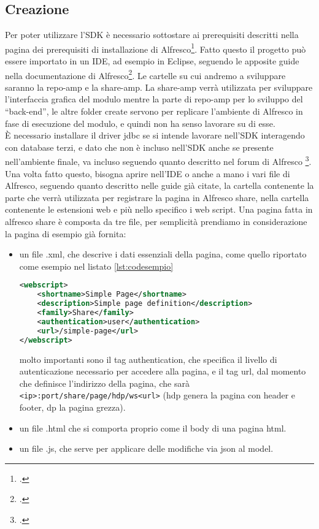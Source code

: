 \subsection{Creazione}
Per poter utilizzare l'SDK è necessario sottostare ai prerequisiti descritti nella pagina dei prerequisiti di installazione di Alfresco\footcite{site:alfresco-prerequisites}.
Fatto questo il progetto può essere importato in un IDE, ad esempio in Eclipse, seguendo le apposite guide nella documentazione di Alfresco\footcite{site:alfresco-rad}. 
Le cartelle su cui andremo a sviluppare saranno la repo-amp e la share-amp. La share-amp verrà utilizzata per sviluppare l’interfaccia grafica del modulo mentre la parte di repo-amp  per lo sviluppo del “back-end”, le altre folder create servono per replicare l’ambiente di Alfresco in fase di esecuzione del modulo, e quindi non ha senso lavorare su di esse.\\
È necessario installare il driver jdbc se si intende  lavorare nell’SDK interagendo con database terzi, e dato che non è incluso nell'SDK anche se presente nell'ambiente finale, va incluso seguendo quanto descritto nel forum di Alfresco \footcite{site:alfresco-jdbc}. 
Una volta fatto questo, bisogna aprire nell’IDE o anche a mano i vari file di Alfresco, seguendo quanto descritto nelle guide già citate, la cartella contenente la parte che verrà utilizzata per registrare la pagina in Alfresco share, nella cartella contenente le estensioni web e più nello specifico i web script. %
Una pagina fatta in alfresco share è composta da tre file, per semplicità prendiamo in considerazione la pagina di esempio già fornita:
\begin{itemize}
\item un file .xml, che descrive i dati essenziali della pagina, come quello riportato come esempio nel listato \ref{lst:codesempio}
\begin{lstlisting}[language=XML, caption=codice di una pagina di esempio, label=lst:codesempio]
<webscript>
    <shortname>Simple Page</shortname>
    <description>Simple page definition</description>
    <family>Share</family>
    <authentication>user</authentication>
    <url>/simple-page</url>
</webscript>
\end{lstlisting}
molto importanti sono il tag authentication, che specifica il livello di autenticazione necessario per accedere alla pagina, e il tag url, dal momento che definisce l’indirizzo della pagina, che sarà \texttt{<ip>:port/share/page/hdp/ws<url>} (hdp genera la pagina con header e footer, dp la pagina grezza).
\item un file .html che si comporta proprio come il body di una pagina html.
\item un file .js, che serve per applicare delle modifiche via json al model.
\end{itemize}
